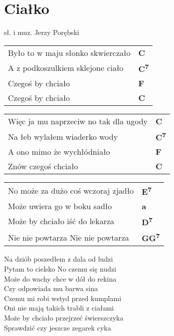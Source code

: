 \section{Ciałko}

sł. i muz. Jerzy Porębski\\

\vspace{2em}
\begin{tabular}{@{}p{10cm}@{}l@{}}
Było to w maju słonko skwierczało & \bfseries C\\
A z podkoszulkiem sklejone ciało & \bfseries C\textsuperscript{7}\\
Czegoś by chciało & \bfseries F\\
Czegoś by chciało & \bfseries C\\
\end{tabular}

\begin{tabular}{@{}p{10cm}@{}l@{}}
Więc ja mu naprzeciw no tak dla ugody & \bfseries C\\
Na łeb wylałem wiaderko wody & \bfseries C\textsuperscript{7}\\
A ono mimo że wychłódniało & \bfseries F\\
Znów czegoś chciało & \bfseries C\\
\end{tabular}

\begin{tabular}{@{}p{10cm}@{}l@{}}
No może za dużo coś wczoraj zjadło & \bfseries E\textsuperscript{7}\\
Może uwiera go w boku sadło & \bfseries a\\
Może by chciało iść do lekarza & \bfseries D\textsuperscript{7}\\
Nie nie powtarza Nie nie powtarza & \bfseries GG\textsuperscript{7}\\
\end{tabular}

\vspace{1em}
Na dziób poszedłem z dala od ludzi \\
Pytam to cielsko No czemu się nudzi \\
Może do wachy chce w dół do rekina \\
Czy odpowiada mu barwa sina \\

Czemu mi robi wstyd przed kumplami \\
Oni nie mają takich trabli z ciałami \\
Może by chciało przejrzeć świerszczyka \\
Sprawdzić czy jeszcze zegarek cyka \\

